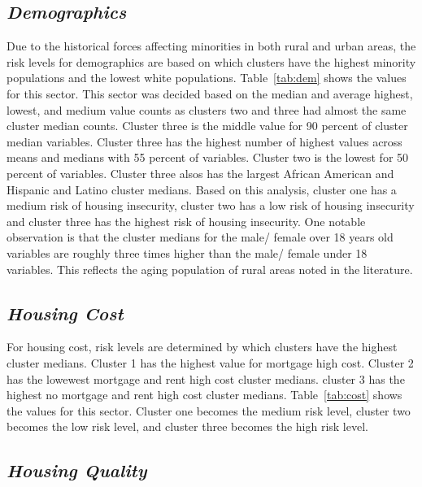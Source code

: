 \subsection{\textit{Demographics}}

Due to the historical forces affecting minorities in both rural and urban areas, the risk levels for demographics are based on which clusters have the highest minority populations and the lowest white populations. 
Table~\ref{tab:dem} shows the values for this sector.  This sector was decided based on the median and average highest, lowest, and medium value counts as clusters two and three had almost the same cluster median counts. Cluster three is the middle value for 90 percent of cluster median variables. Cluster three has the highest number of highest values across means and medians with 55 percent of variables. Cluster two is the lowest for 50 percent of variables. Cluster three alsos has the largest African American and Hispanic and Latino cluster medians. Based on this analysis, cluster one has a medium risk of housing insecurity, cluster two has a low risk of housing insecurity and cluster three has the highest risk of housing insecurity. One notable observation is that the cluster medians for the male/ female over 18 years old variables are roughly three times higher than the male/ female under 18 variables. This reflects the aging population of rural areas noted in the literature. 



\subsection{\textit{Housing Cost}}

For housing cost, risk levels are determined by which clusters have the highest cluster medians. Cluster 1 has the highest value for mortgage high cost. Cluster 2 has the lowewest mortgage and rent high cost cluster medians. cluster 3 has the highest no mortgage and rent high cost cluster medians. Table~\ref{tab:cost} shows the values for this sector. Cluster one becomes the medium risk level, cluster two becomes the low risk level, and cluster three becomes the high risk level. 



\subsection{\textit{Housing Quality}}

